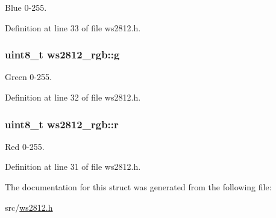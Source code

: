 Blue 0-\/255. 



Definition at line 33 of file ws2812.\+h.

\hypertarget{structws2812__rgb_aaf5b0f4db796641e1cd16bd4f70fc7ac}{}
\subsubsection[{g}]{\setlength{\rightskip}{0pt plus 5cm}uint8\+\_\+t ws2812\+\_\+rgb\+::g}\label{structws2812__rgb_aaf5b0f4db796641e1cd16bd4f70fc7ac}


Green 0-\/255. 



Definition at line 32 of file ws2812.\+h.

\hypertarget{structws2812__rgb_accf7188c624788256477c2e4ee54515b}{}
\subsubsection[{r}]{\setlength{\rightskip}{0pt plus 5cm}uint8\+\_\+t ws2812\+\_\+rgb\+::r}\label{structws2812__rgb_accf7188c624788256477c2e4ee54515b}


Red 0-\/255. 



Definition at line 31 of file ws2812.\+h.



The documentation for this struct was generated from the following file\+:\begin{DoxyCompactItemize}
\item 
src/\hyperlink{ws2812_8h}{ws2812.\+h}\end{DoxyCompactItemize}
